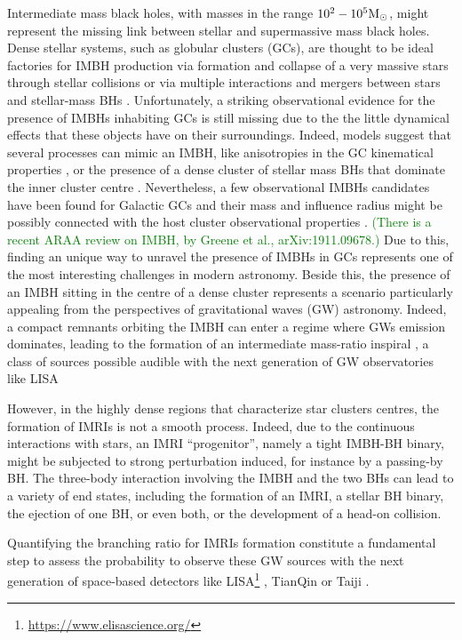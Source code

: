 \documentclass[twocolumn]{aastex62}
\newcommand{\Ms}{{\rm M}_\odot}
\newcommand{\xian}{\textcolor{green}}
\begin{document}
Intermediate mass black holes, with masses in the range $10^2-10^5\Ms$, might
represent the missing link between stellar and supermassive mass black holes.
Dense stellar systems, such as globular clusters (GCs), are thought to be ideal
factories for IMBH production via formation and collapse of a very massive
stars through stellar collisions \citep{zwart02, giersz15, mapelli16} or via
multiple interactions and mergers between stars and stellar-mass BHs
\citep{giersz15}. Unfortunately, a striking observational evidence for the
presence of IMBHs inhabiting GCs is still missing due to the the little
dynamical effects that these objects have on their surroundings. Indeed, models
suggest that several processes can mimic an IMBH, like anisotropies in the GC
kinematical properties \citep{zocchi}, or the presence of a dense cluster of
stellar mass BHs that dominate the inner cluster centre
\citep{AAG18a,AAG18b,AS16,vandermarel10}. Nevertheless, a few observational
IMBHs candidates have been found for Galactic GCs
\citep{noyola10,lu13,lanzoni13,kiziltan17} and their mass and influence radius
might be possibly connected with the host cluster observational properties
\citep{AAG18a}. \xian{(There is a recent ARAA review on IMBH, by Greene et al., arXiv:1911.09678.)} Due to this, finding an unique way to unravel the presence of
IMBHs in GCs represents one of the most interesting challenges in modern
astronomy. Beside this, the presence of an IMBH sitting in the centre of a
dense cluster represents a scenario particularly appealing from the
perspectives of gravitational waves (GW) astronomy. Indeed, a compact remnants
orbiting the IMBH can enter a regime where GWs emission dominates, leading to
the formation of an intermediate mass-ratio inspiral
\citep[IMRI,][]{konstantinidis13,haster16,leigh14}, a class of sources possible
audible with the next generation of GW observatories like LISA
\citep{seoane07,amaro12,seoane18}

However, in the highly dense regions that characterize star clusters centres,
the formation of IMRIs is not a smooth process. Indeed, due to the continuous
interactions with stars, an IMRI ``progenitor'', namely a tight IMBH-BH binary,
might be subjected to strong perturbation induced, for instance by a passing-by
BH. The three-body interaction involving the IMBH and the two BHs can lead to a
variety of end states, including the formation of an IMRI, a stellar BH binary,
the ejection of one BH, or even both, or the development of a head-on
collision. 

Quantifying the branching ratio for IMRIs formation constitute a fundamental
step to assess the probability to observe these GW sources with the next
generation of space-based detectors like
LISA\footnote{\url{https://www.elisascience.org/}} \citep{seoane07}, TianQin
\citep{tianqin16} or Taiji \citep{taiji17}.
\end{document}
